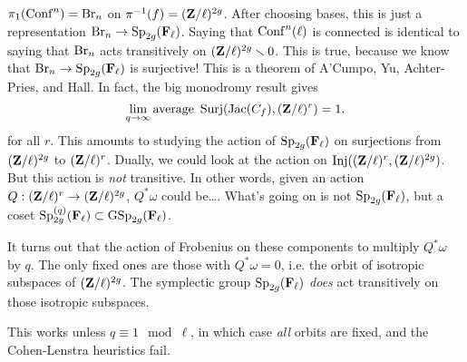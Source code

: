 $\pi_1(\operatorname{Conf}^n)=\textnormal{Br}_n$ on $\pi^{-1}(f) =(\mathbf{Z}/\ell)^{2 g}$. After 
choosing bases, this is just a representation 
$\textnormal{Br}_n \to \operatorname{Sp}_{2 g}(\mathbf{F}_\ell)$.  Saying that $\operatorname{Conf}^n(\ell)$ is 
connected is identical to saying that $\textnormal{Br}_n$ acts transitively on 
$(\mathbf{Z}/\ell)^{2 g}\smallsetminus 0$. This is true, because we know that 
$\textnormal{Br}_n\to \operatorname{Sp}_{2 g}(\mathbf{F}_\ell)$ is surjective! This is a theorem of 
A'Cumpo, Yu, Achter-Pries, and Hall. In fact, the big monodromy result gives 
\[
  \lim_{q\to \infty} \text{average } \operatorname{Surj}(\operatorname{Jac}(C_f),(\mathbf{Z}/\ell)^r) = 1 .
\]
for all $r$. This amounts to studying the action of $\operatorname{Sp}_{2g}(\mathbf{F}_\ell)$ 
on surjections from $(\mathbf{Z}/\ell)^{2 g}$ to $(\mathbf{Z}/\ell)^r$. Dually, we could look 
at the action on $\operatorname{Inj}((\mathbf{Z}/\ell)^r,(\mathbf{Z}/\ell)^{2 g})$. But this 
action is \emph{not} transitive. In other words, given an action 
$Q:(\mathbf{Z}/\ell)^r \to (\mathbf{Z}/\ell)^{2 g}$, $Q^\ast\omega$ could be\ldots. What's 
going on is not $\operatorname{Sp}_{2g}(\mathbf{F}_\ell)$, but a coset 
$\operatorname{Sp}_{2 g}^{(q)}(\mathbf{F}_\ell)\subset \operatorname{GSp}_{2 g}(\mathbf{F}_\ell)$. 

It turns out that the action of Frobenius on these components to multiply 
$Q^\ast \omega$ by $q$. The only fixed ones are those with $Q^\ast\omega=0$, i.e. 
the orbit of isotropic subspaces of $(\mathbf{Z}/\ell)^{2 g}$. The symplectic group 
$\operatorname{Sp}_{2 g}(\mathbf{F}_\ell)$ \emph{does} act transitively on those isotropic 
subspaces. 

This works unless $q\equiv 1\mod \ell$, in which case \emph{all} orbits are 
fixed, and the Cohen-Lenstra heuristics fail. 




